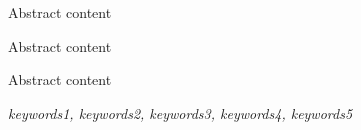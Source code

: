 \newpage
\vspace{-1cm}
\chapter*{}
\vspace{-0.5cm}

Abstract content

Abstract content

Abstract content

\vspace{0.5cm}
\hspace{-1cm}
{\bf{}} \textit{keywords1, keywords2, keywords3, keywords4, keywords5}





































